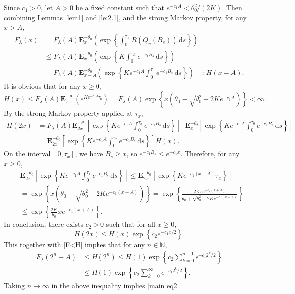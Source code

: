 \documentclass[11pt]{article}
\numberwithin{equation}{section}
\begin{document}
Since $c_1>0$,  let $A>0$ be a fixed constant such that $e^{-c_1 A} < \theta_0^2/(2K)$. Then combining Lemmas \ref{lem1} and  \ref{le:2.1}, and the strong Markov property, 
 for any $x>A$,
\begin{align}\label{F<H}
	F_\lambda(x)
	&= 
	F_\lambda(A) \mathbf E_x^{-\theta_0} \left( \exp\left\{ \int_0^{\tau_A} R(Q_v(B_s)) \, \mathrm{d}s \right\} \right) 
	\nonumber \\
	&\le 
	F_\lambda(A)  \mathbf E_x^{-\theta_0} \left( \exp\left\{ K \int_0^{\tau_A} e^{-c_1 B_s} \, \mathrm{d}s \right\} \right)\nonumber\\
	& = 	F_\lambda(A)  \mathbf E_{x-A}^{-\theta_0} \left( \exp\left\{ Ke^{-c_1 A} \int_0^{\tau_0} e^{-c_1 B_s} \, \mathrm{d}s \right\} \right)
	 =: H(x-A).
\end{align}
It is obvious that  for any $x\geq 0$,
\[
H(x)\leq F_\lambda(A)  \mathbf E_{x}^{-\theta_0} \left( e^{Ke^{-c_1 A}  \tau_0}\right) = 
F_\lambda(A)
\exp\left\{x\left(\theta_0 -\sqrt{\theta_0^2-2Ke^{-c_1 A}}\right)\right\}<\infty. 
\]
By the strong Markov property applied at $\tau_x$,
\begin{align*}
	H(2x)
	&= 
	F_\lambda(A)\mathbf E_{2x}^{-\theta_0} \left[ \exp\left\{ Ke^{-c_1A} \int_0^{\tau_x} e^{-c_1 B_s} \, \mathrm{d}s \right\} \right]	\cdot \mathbf E_x^{-\theta_0} \left[ \exp\left\{ K e^{-c_1A} \int_0^{\tau_0} e^{-c_1 B_s} \, \mathrm{d}s \right\} \right] \\
	&=
	\mathbf E_{2x}^{-\theta_0} \left[ \exp\left\{ Ke^{-c_1A} \int_0^{\tau_x} e^{-c_1 B_s} \, \mathrm{d}s \right\} \right] H(x).
\end{align*}
On the interval $[0, \tau_x]$, we have $B_s \ge x$, so $e^{-c_1 B_s} \le e^{-c_1 x}$. 
Therefore, for any $x\geq 0$, 
\begin{align*}
	&\mathbf E_{2x}^{-\theta_0} \left[ \exp\left\{ Ke^{-c_1A} \int_0^{\tau_x} e^{-c_1 B_s} \, \mathrm{d}s \right\} \right]	\le \mathbf E_{2x}^{-\theta_0} \left[ \exp\left\{ K e^{-c_1 (x+A)} \tau_x \right\} \right] \\	&= \exp\left\{ x \left( \theta_0 - \sqrt{\theta_0^2 - 2K e^{-c_1 (x+A)}} \right) \right\} = \exp\left\{ \frac{2K xe^{-c_1(x+A)}}{\theta_0+ \sqrt{\theta_0^2 - 2K e^{-c_1 (x+A)}} }\right\}   \\	&\le \exp\left\{ \frac{2K}{\theta_0} x e^{-c_1 (x+A)} \right\}.
\end{align*}
In conclusion,
 there exists $c_2 > 0$ such that for all 
 $x\geq 0$,
\begin{equation*}
	H(2x) \le H(x) \exp\left\{ c_2 e^{-c_1 x/2} \right\}.
\end{equation*}
This together with \eqref{F<H} implies that for any $n \in \mathbb{N}$,
\begin{align*}
	F_\lambda(2^n +A) 	&\le H(2^n ) 	\le H(1) \exp\left\{ c_2 \sum_{k=0}^{n-1} e^{-c_1 2^k  / 2} \right\} \\	&\le H(1) \exp\left\{ c_2 \sum_{k=0}^{\infty} e^{-c_1 2^k  / 2} \right\}.
\end{align*}
Taking $n \to \infty$ in the above inequality implies \eqref{main eq2}.
\end{document}
